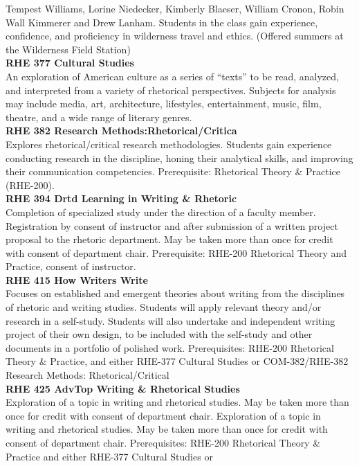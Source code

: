 \documentclass[
  letterpaper,
]{scrbook}
\begin{document}
Tempest Williams, Lorine Niedecker, Kimberly Blaeser, William Cronon,
Robin Wall Kimmerer and Drew Lanham. Students in the class gain
experience, confidence, and proficiency in wilderness travel and ethics.
(Offered summers at the Wilderness Field Station)\\
\textbf{RHE 377 Cultural Studies}\\
An exploration of American culture as a series of ``texts'' to be read,
analyzed, and interpreted from a variety of rhetorical perspectives.
Subjects for analysis may include media, art, architecture, lifestyles,
entertainment, music, film, theatre, and a wide range of literary
genres.\\
\textbf{RHE 382 Research Methods:Rhetorical/Critica}\\
Explores rhetorical/critical research methodologies. Students gain
experience conducting research in the discipline, honing their
analytical skills, and improving their communication competencies.
Prerequisite: Rhetorical Theory \& Practice (RHE-200).\\
\textbf{RHE 394 Drtd Learning in Writing \& Rhetoric}\\
Completion of specialized study under the direction of a faculty member.
Registration by consent of instructor and after submission of a written
project proposal to the rhetoric department. May be taken more than once
for credit with consent of department chair. Prerequisite: RHE-200
Rhetorical Theory and Practice, consent of instructor.\\
\textbf{RHE 415 How Writers Write}\\
Focuses on established and emergent theories about writing from the
disciplines of rhetoric and writing studies. Students will apply
relevant theory and/or research in a self-study. Students will also
undertake and independent writing project of their own design, to be
included with the self-study and other documents in a portfolio of
polished work. Prerequisites: RHE-200 Rhetorical Theory \& Practice, and
either RHE-377 Cultural Studies or COM-382/RHE-382 Research Methods:
Rhetorical/Critical\\
\textbf{RHE 425 AdvTop Writing \& Rhetorical Studies}\\
Exploration of a topic in writing and rhetorical studies. May be taken
more than once for credit with consent of department chair. Exploration
of a topic in writing and rhetorical studies. May be taken more than
once for credit with consent of department chair. Prerequisites: RHE-200
Rhetorical Theory \& Practice and either RHE-377 Cultural Studies or
\end{document}
